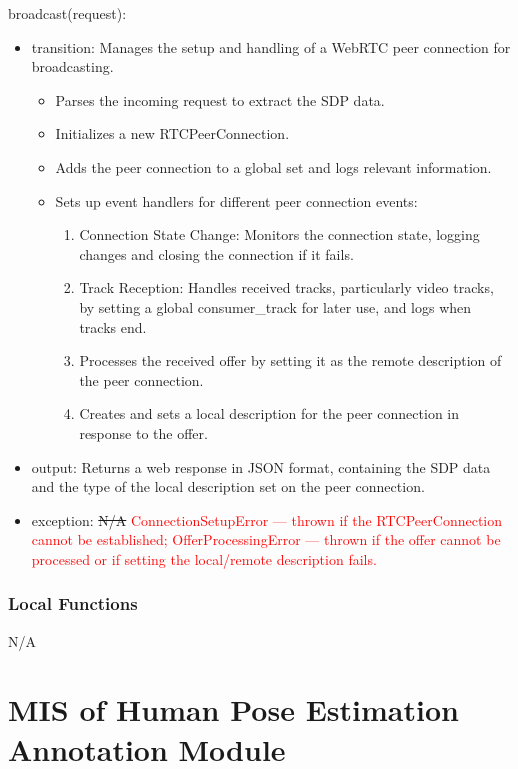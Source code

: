 \documentclass[12pt, titlepage]{article}
\newcommand{\rt}[1]{\textcolor{red}{#1}}
\begin{document}
\noindent broadcast(request):
\begin{itemize}
\item transition: Manages the setup and handling of a WebRTC peer connection for
  broadcasting.

  \begin{itemize}
  \item Parses the incoming request to extract the SDP data.
  \item Initializes a new RTCPeerConnection.
  \item Adds the peer connection to a global set and logs relevant information.
  \item Sets up event handlers for different peer connection events:
    \begin{enumerate}
    \item Connection State Change: Monitors the connection state, logging changes
      and closing the connection if it fails.
    \item Track Reception: Handles received tracks, particularly video tracks, by
      setting a global consumer\_track for later use, and logs when tracks end.
    \item Processes the received offer by setting it as the remote description of
      the peer connection.
    \item Creates and sets a local description for the peer connection in response
      to the offer.
    \end{enumerate}
  \end{itemize}
\item output: Returns a web response in JSON format, containing the SDP data and
  the type of the local description set on the peer connection.
\item exception: \sout{N/A} \rt{ConnectionSetupError --- thrown if the RTCPeerConnection cannot be established; OfferProcessingError --- thrown if the offer cannot be processed or if setting the local/remote description fails.}
\end{itemize}

\subsubsection{Local Functions}
N/A

\section{MIS of Human Pose Estimation Annotation Module} \label{sec:hpe}
\end{document}
